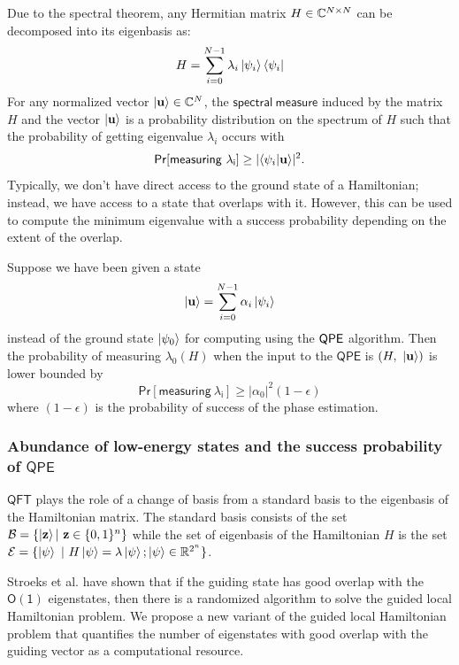 \documentclass[11pt]{article}
\begin{document}
Due to the spectral theorem, any Hermitian matrix $H\in \mathbb{C}^{N\times N}$ can be decomposed into its eigenbasis as:
$$H=\sum_{i=0}^{N-1}\lambda_i\ket{\psi_i}\bra{\psi_i}$$
For any normalized vector $\ket{\mathbf{u}} \in \mathbb{C}^N $,  the $\mathsf{spectral\ measure}$ induced by the matrix $H$ and the vector $\ket{\mathbf{u}}$ is a probability distribution on the spectrum of $H$ such that the probability of getting eigenvalue $\lambda_i$ occurs with 
\begin{equation}
    \mathsf{Pr[measuring\ \lambda_i]} \geq | \langle \psi_i|\uu\rangle|^2.
\end{equation}
Typically, we don't have direct access to the ground state of a Hamiltonian; instead, we have access to a state that overlaps with it. However, this can be used to compute the minimum eigenvalue with a success probability depending on the extent of the overlap.

\begin{lemma}
    Suppose we have been given a state 
    \begin{equation}
        \ket{\mathbf{u}} = \sum_{i=0}^{N-1} \alpha_{i} \ket{\psi_i}
    \end{equation}
    instead of the ground state $\ket{\psi_0}$ for computing  using the $\mathsf{QPE}$ algorithm. Then the probability of measuring $\lambda_0(H)$ when the input to the $\mathsf{QPE}$ is $(H,\ \ket{\mathbf{u}})$ is lower bounded by 
    \begin{equation}
        \mathsf{Pr[measuring\ \lambda_i]} \geq |\alpha_0|^2(1-\epsilon)
    \end{equation}
    where $(1-\epsilon)$ is the probability of success of the phase estimation.

\end{lemma}

\subsubsection{Abundance of low-energy states and the success probability of $\mathsf{QPE}$ }
$\mathsf{QFT}$ plays the role of a change of basis from a standard basis to the eigenbasis of the Hamiltonian matrix. The standard basis consists of the set $\mathcal{B}=\{\ket{\mathbf{z}} |\ \mathbf{z} \in \{0,1\}^n\}$ while the set of eigenbasis of the Hamiltonian $H$ is the set $\mathcal{E}=\{\ket{\psi}\ |\ H\ket{\psi}=\lambda\si; \si \in {\R^{2^n}} \}$.\par Stroeks et al. have shown that if the guiding state has good overlap with the $\mathsf{O(1)}$ eigenstates, then there is a randomized algorithm to solve the guided local Hamiltonian problem. We propose a new variant of the guided local Hamiltonian problem that quantifies the number of eigenstates with good overlap with the guiding vector as a computational resource.
\end{document}
